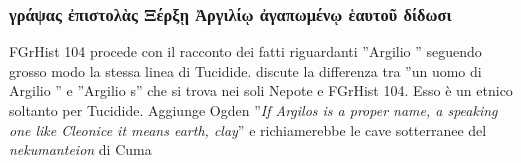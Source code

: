 {            \subsubsection{\textgreek{γράψας ἐπιστολὰς Ξέρξῃ Ἀργιλίῳ ἀγαπωμένῳ ἑαυτοῦ δίδωσι}}
            FGrHist 104 procede con il racconto dei fatti riguardanti ''Argilio '' seguendo grosso modo la stessa linea di Tucidide. \cite[124]{Ogden2002} discute la differenza tra ''un uomo di Argilio '' e ''Argilio s'' che si trova nei soli  Nepote e FGrHist 104. Esso è un etnico soltanto per Tucidide. Aggiunge Ogden ''\emph{If Argilos is a proper name, a speaking one like Cleonice it means earth, clay}'' e richiamerebbe le cave sotterranee del \emph{nekumanteion} di Cuma 
}
